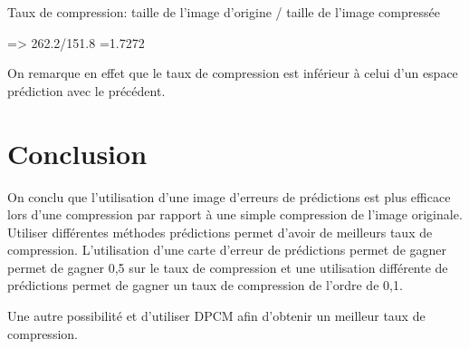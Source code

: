 \documentclass{article}
\begin{document}
Taux de compression: taille de l'image d'origine / taille de l'image compressée

=> 262.2/151.8 =1.7272

On remarque en effet que le taux de compression est inférieur à celui d'un espace prédiction avec le précédent.

\section*{Conclusion}
On conclu que l'utilisation d'une image d'erreurs de prédictions est plus efficace lors d'une compression par rapport à une simple compression de l'image originale.
Utiliser différentes méthodes prédictions permet d'avoir de meilleurs taux de compression.
L'utilisation d'une carte d'erreur de prédictions permet de gagner permet de gagner 0,5 sur le taux de compression et une utilisation différente de prédictions permet de gagner un taux de compression de l'ordre de 0,1.

Une autre possibilité et d'utiliser DPCM afin d'obtenir un meilleur taux de compression.
\end{document}
